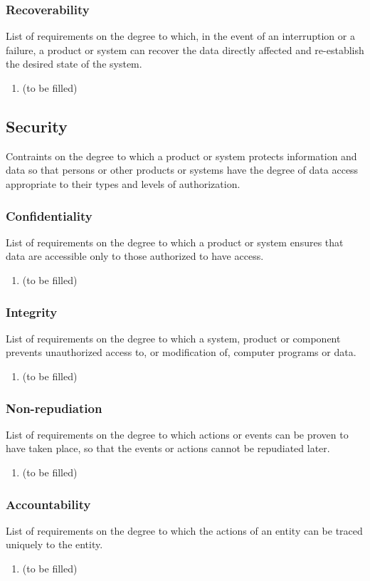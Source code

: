 \subsubsection{Recoverability}
List of requirements on the degree to which, in the event of an interruption or a failure, a product or system can recover the data directly affected and re-establish the desired state of the system.
\begin{enumerate}
\item (to be filled)
\end{enumerate}


\subsection{Security}
Contraints on the degree to which a product or system protects information and data so that persons or other products or systems have the degree of data access appropriate to their types and levels of authorization.
\subsubsection{Confidentiality}
List of requirements on the degree to which a product or system ensures that data are accessible only to those authorized to have access.
\begin{enumerate}
\item (to be filled)
\end{enumerate}
\subsubsection{Integrity}
List of requirements on the degree  to  which  a  system,  product  or  component  prevents  unauthorized  access  to,  or  modification  of, computer programs or data.
\begin{enumerate}
\item (to be filled)
\end{enumerate}
\subsubsection{Non-repudiation}
List of requirements on the degree to which actions or events can be proven to have taken place, so that the events or actions cannot be repudiated later.
\begin{enumerate}
\item (to be filled)
\end{enumerate}
\subsubsection{Accountability}
List of requirements on the degree to which the actions of an entity can be traced uniquely to the entity.
\begin{enumerate}
\item (to be filled)
\end{enumerate}
